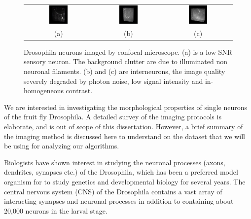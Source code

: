 \begin{figure}[t]
\centering
\setlength{\tabcolsep}{0.1 cm}
\begin{tabular}{ccc}
\includegraphics[width=0.29\textwidth]{images/lowSNR_1}	&
\includegraphics[width=0.29\textwidth]{images/lowSNR_2}	&
\includegraphics[width=0.29\textwidth]{images/lowSNR_3} \\
\scriptsize(a) & \scriptsize(b) & \scriptsize(c)
\end{tabular}
\caption[3D neuron example]{Drosophila neurons imaged by confocal microscope. (a) is a low SNR sensory neuron. The background clutter are due
to illuminated non neuronal filaments. (b) and (c) are interneurons, the image quality severely degraded by photon noise, low signal
intensity and in-homogeneous contrast.}
\label{fig:neuron_stack}
\end{figure}

We are interested in investigating the morphological properties of single neurons of the fruit fly Drosophila. A detailed survey of the imaging protocols is elaborate, and is out of scope of this dissertation. However, a brief summary of the imaging method is discussed here to understand on the dataset that we will be using for analyzing our algorithms.

Biologists have shown interest in studying the neuronal processes (axons, dendrites, synapses etc.) of the Drosophila, which has been a preferred model organism for to study genetics and developmental biology for several years.  The central nervous system (CNS) of the Drosophila contains a vast array of interacting synapses and neuronal processes in addition to containing about 20,000 neurons in the larval stage.  

